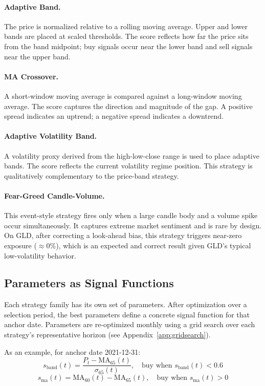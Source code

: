 \documentclass[11pt, letterpaper]{article}
\begin{document}
\paragraph{Adaptive Band.}
The price is normalized relative to a rolling moving average. Upper and lower
bands are placed at scaled thresholds. The score reflects how far the price sits
from the band midpoint; buy signals occur near the lower band and sell signals
near the upper band.

\paragraph{MA Crossover.}
A short-window moving average is compared against a long-window moving average.
The score captures the direction and magnitude of the gap. A positive spread
indicates an uptrend; a negative spread indicates a downtrend.

\paragraph{Adaptive Volatility Band.}
A volatility proxy derived from the high-low-close range is used to place adaptive
bands. The score reflects the current volatility regime position. This strategy is
qualitatively complementary to the price-band strategy.

\paragraph{Fear-Greed Candle-Volume.}
This event-style strategy fires only when a large candle body and a volume spike
occur simultaneously. It captures extreme market sentiment and is rare by design.
On GLD, after correcting a look-ahead bias, this strategy triggers near-zero
exposure ($\approx 0\%$), which is an expected and correct result given GLD's
typical low-volatility behavior.

\subsection{Parameters as Signal Functions}

Each strategy family has its own set of parameters. After optimization over a
selection period, the best parameters define a concrete signal function for that
anchor date. Parameters are re-optimized monthly using a grid search over each
strategy's representative horizon (see Appendix~\ref{app:gridsearch}).

As an example, for anchor date 2021-12-31:
\[
  s_{\text{band}}(t) = \frac{P_t - \text{MA}_{65}(t)}{\sigma_{65}(t)},
  \quad \text{buy when } s_{\text{band}}(t) < 0.6
\]
\[
  s_{\text{ma}}(t) = \text{MA}_{60}(t) - \text{MA}_{65}(t),
  \quad \text{buy when } s_{\text{ma}}(t) > 0
\]
\end{document}
